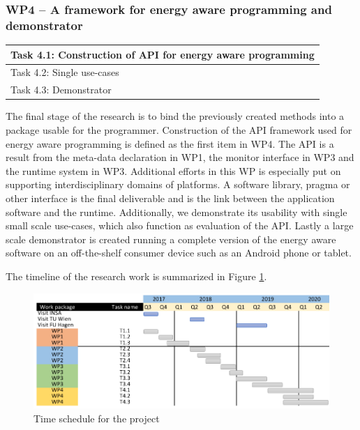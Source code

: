 \documentclass{article}
\begin{document}
\subsubsection{WP4 -- A framework for energy aware programming and demonstrator}
\begin{table}
\vspace{-0.5cm}
\small
\begin{tabular}{ | l |}
\hline
Task 4.1: Construction of API for energy aware programming\\ \hline
Task 4.2: Single use-cases \\ \hline
Task 4.3: Demonstrator\\ \hline
\end{tabular}
\vspace{-0.3cm}
\end{table}
The final stage of the research is to bind the previously created methods into a package usable for the programmer.
Construction of the API framework used for energy aware programming is defined as the first item in WP4.
The API is a result from the meta-data declaration in WP1, the monitor interface in WP3 and the runtime system in WP3.
Additional efforts in this WP is especially put on supporting interdisciplinary domains of platforms.
A software library, pragma or other interface is the final deliverable and is the link between the application software and the runtime.
Additionally, we demonstrate its usability with single small scale use-cases, which also function as evaluation of the API.
Lastly a large scale demonstrator is created running a complete version of the energy aware software on an off-the-shelf consumer device such as an Android phone or tablet.

The timeline of the research work is summarized in Figure \ref{fig:schedule}.
\begin{figure}[h]
	\centering
	\includegraphics[scale=0.45]{fig/schedule.png}
	\caption{Time schedule for the project}
	\label{fig:schedule}
\end{figure}
\end{document}
